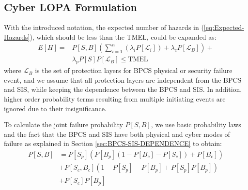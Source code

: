 \documentclass[journal]{IEEEtran}
\begin{document}

\subsection{Cyber LOPA Formulation}
With the introduced notation, the expected number of hazards in (\ref{eq:Expected-Hazards}), which should be less than the TMEL, could be expanded as:
\begin{align}     
E[H] = & P[S,B] \left( \sum_{i=1}^n \left( \lambda_i P[\mathcal{L}_i] \right) + \lambda_c P[\mathcal{L}_B] \right) + \nonumber \\ 
& \lambda_p P[S] P[\mathcal{L}_B] \leq \text{TMEL}
\label{eq:LOPA-GENERAL}
\end{align}
where $\mathcal{L}_B$ is the set of protection layers for BPCS physical or security failure event, and we assume that all protection layers are independent from the BPCS and SIS, while keeping the dependence between the BPCS and SIS. In addition, higher order probability terms resulting from multiple initiating events are ignored due to their insignificance.

To calculate the joint failure probability $P[S,B]$, we use basic probability laws and the fact that the BPCS and SIS have both physical and cyber modes of failure as explained in Section \ref{sec:BPCS-SIS-DEPENDENCE} to obtain:
\begin{align}     
P[S,B] &= P[S_p] \left( P[B_p](1-P[B_c]-P[S_c])+P[B_c] \right) \nonumber \\
&+ P[S_c,B_c] \left( 1 - P[S_p] - P[B_p] + P[S_p]P[B_p] \right) \nonumber \\
&+ P[S_c]P[B_p] \label{eq:Joint-Prob}
\end{align}


\end{document}
